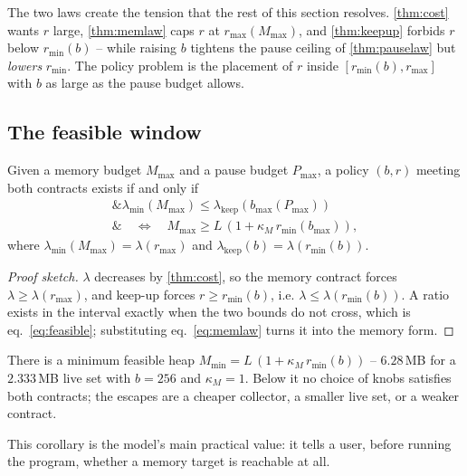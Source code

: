 The two laws create the tension that the rest of this section resolves.
\thm\ref{thm:cost} wants $r$ large, \thm\ref{thm:memlaw} caps $r$ at $r_{\max}(M_{\max})$, and
\thm\ref{thm:keepup} forbids $r$ below $r_{\min}(b)$ -- while raising $b$ tightens the pause ceiling
of \thm\ref{thm:pauselaw} but \emph{lowers} $r_{\min}$.
The policy problem is the placement of $r$ inside $[r_{\min}(b), r_{\max}]$ with $b$ as large as the
pause budget allows.

\subsection{The feasible window}
\label{sec:roofline-feasible}

\begin{theorem}[Feasibility]
\label{thm:feasible}
Given a memory budget $M_{\max}$ and a pause budget $P_{\max}$, a policy $(b, r)$ meeting both
contracts exists if and only if
\begin{equation}
\begin{aligned}
\&\lambda_{\min}(M_{\max}) \le \lambda_{\text{keep}}(b_{\max}(P_{\max}))\\
\&\quad\Longleftrightarrow\quad M_{\max} \ge L\,(1 + \kappa_M\, r_{\min}(b_{\max})),
\end{aligned}
\label{eq:feasible}
\end{equation}
where $\lambda_{\min}(M_{\max}) = \lambda(r_{\max})$ and
$\lambda_{\text{keep}}(b) = \lambda(r_{\min}(b))$.
\end{theorem}
\begin{proof}[Proof sketch]
$\lambda$ decreases by \thm\ref{thm:cost}, so the memory contract forces
$\lambda \ge \lambda(r_{\max})$, and keep-up forces $r \ge r_{\min}(b)$, i.e.
$\lambda \le \lambda(r_{\min}(b))$.
A ratio exists in the interval exactly when the two bounds do not cross, which is eq.~\ref{eq:feasible};
substituting eq.~\ref{eq:memlaw} turns it into the memory form.
\end{proof}

\begin{corollary}
\label{cor:floor}
There is a minimum feasible heap $M_{\min} = L\,(1 + \kappa_M\,r_{\min}(b))$ -- $6.28$\,MB for a
$2.333$\,MB live set with $b = 256$ and $\kappa_M = 1$.
Below it no choice of knobs satisfies both contracts; the escapes are a cheaper collector, a smaller
live set, or a weaker contract.
\end{corollary}

This corollary is the model's main practical value: it tells a user, before running the program,
whether a memory target is reachable at all.

